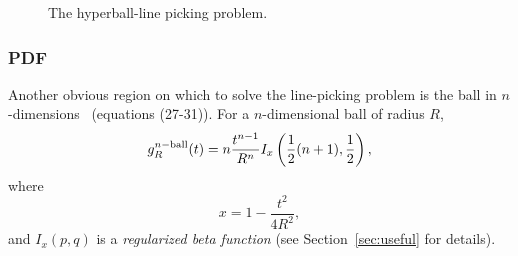 \begin{figure}[tbp]
  \begin{center}
    \hspace{6mm}
    \caption{The hyperball-line picking problem.}
  \end{center} 
\vspace{-4mm}
\end{figure}

\subsubsection{PDF}

Another obvious region on which to solve the line-picking problem is
the ball in $n$-dimensions~\cite{tu00:_circle_line} (equations
(27-31)). For a $n$-dimensional ball of radius $R$,
\begin{equation}
 g^{n-{\rm ball}}_R(t) = n \frac{t^{n-1}}{R^n} I_x\left( 
  \frac{1}{2} (n+1), \frac{1}{2}
                      \right),
\end{equation}
where
\begin{equation}
 x = 1 - \frac{t^2}{4 R^2}, 
\end{equation}
and $I_x(p,q)$ is a {\em regularized beta function} (see
Section~\ref{sec:useful} for details).

